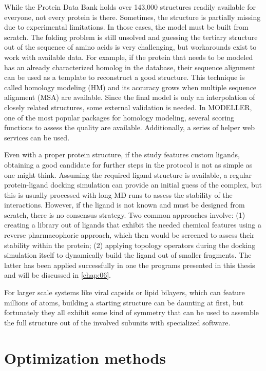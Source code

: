 While the Protein Data Bank holds over 143,000 structures readily available for everyone, not every protein is there. Sometimes, the structure is partially missing due to experimental limitations. In those cases, the model must be built from scratch. The folding problem\cite{Dill1042} is still unsolved and guessing the tertiary structure out of the sequence of amino acids is very challenging, but workarounds exist to work with available data. For example, if the protein that needs to be modeled has an already characterized homolog in the database, their sequence alignment can be used as a template to reconstruct a good structure. This technique is called homology modeling (HM) and its accuracy grows when multiple sequence alignment (MSA) are available. Since the final model is only an interpolation of closely related structures, some external validation is needed. In MODELLER, one of the most popular packages for homology modeling, several scoring functions to assess the quality are available. Additionally, a series of helper web services can be used.\cite{errat,benkert2008qmean,wang2011apollo}

Even with a proper protein structure, if the study features custom ligands, obtaining a good candidate for further steps in the protocol is not as simple as one might think. Assuming the required ligand structure is available, a regular protein-ligand docking simulation can provide an initial guess of the complex, but this is usually processed with long MD runs to assess the stability of the interactions. However, if the ligand is not known and must be designed from scratch, there is no consensus strategy. Two common approaches involve: (1) creating a library out of ligands that exhibit the needed chemical features using a reverse pharmacophoric approach, which then would be screened to assess their stability within the protein; (2) applying topology operators during the docking simulation itself to dynamically build the ligand out of smaller fragments. The latter has been applied successfully in one the programs presented in this thesis and will be discussed in \autoref{chap:06}.

For larger scale systems like viral capsids or lipid bilayers, which can feature millions of atoms, building a starting structure can be daunting at first, but fortunately they all exhibit some kind of symmetry that can be used to assemble the full structure out of the involved subunits with specialized software.\cite{bietz2016siena,sym}

\section{Optimization methods}

